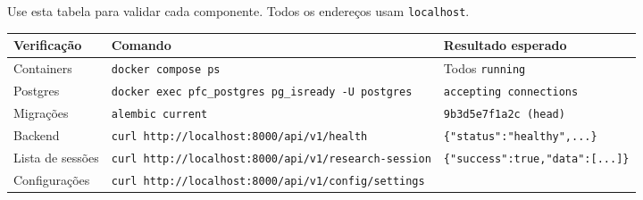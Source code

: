 \documentclass[
  brazilian,
  a4paper,12pt,oneside]{report}
\newcounter{none} %
\begin{document}
Use esta tabela para validar cada componente. Todos os endereços usam
\texttt{localhost}.

{\def\LTcaptype{none} %
\begin{longtable}[]{@{}
  >{\raggedright\arraybackslash}p{}
  >{\raggedright\arraybackslash}p{}
  >{\raggedright\arraybackslash}p{}@{}}
\toprule\noalign{}
\begin{minipage}[b]{\linewidth}\raggedright
Verificação
\end{minipage} & \begin{minipage}[b]{\linewidth}\raggedright
Comando
\end{minipage} & \begin{minipage}[b]{\linewidth}\raggedright
Resultado esperado
\end{minipage} \\
\midrule\noalign{}
\endhead
\bottomrule\noalign{}
\endlastfoot
Containers & \texttt{docker\ compose\ ps} & Todos \texttt{running} \\
Postgres &
\texttt{docker\ exec\ pfc\_}\allowbreak{}\texttt{postgres\ pg\_}\allowbreak{}\texttt{isready\ -}\allowbreak{}\texttt{U\ postgres}
& \texttt{accepting\ connections} \\
Migrações & \texttt{alembic\ current} & \texttt{9b3d5e7f1a2c\ (head)} \\
Backend &
\texttt{curl\ http:}\allowbreak{}\texttt{/}\allowbreak{}\texttt{/}\allowbreak{}\texttt{localhost:}\allowbreak{}\texttt{8000/}\allowbreak{}\texttt{api/}\allowbreak{}\texttt{v1/}\allowbreak{}\texttt{health}
&
\texttt{\{"status":}\allowbreak{}\texttt{"healthy",.}\allowbreak{}\texttt{.}\allowbreak{}\texttt{.}\allowbreak{}\texttt{\}} \\
Lista de sessões &
\texttt{curl\ http:}\allowbreak{}\texttt{/}\allowbreak{}\texttt{/}\allowbreak{}\texttt{localhost:}\allowbreak{}\texttt{8000/}\allowbreak{}\texttt{api/}\allowbreak{}\texttt{v1/}\allowbreak{}\texttt{research-}\allowbreak{}\texttt{session}
&
\texttt{\{"success":}\allowbreak{}\texttt{true,"data":}\allowbreak{}\texttt{{[}.}\allowbreak{}\texttt{.}\allowbreak{}\texttt{.}\allowbreak{}\texttt{{]}\}} \\
Configurações &
\texttt{curl\ http:}\allowbreak{}\texttt{/}\allowbreak{}\texttt{/}\allowbreak{}\texttt{localhost:}\allowbreak{}\texttt{8000/}\allowbreak{}\texttt{api/}\allowbreak{}\texttt{v1/}\allowbreak{}\texttt{config/}\allowbreak{}\texttt{settings}

\end{longtable}}
\end{document}
